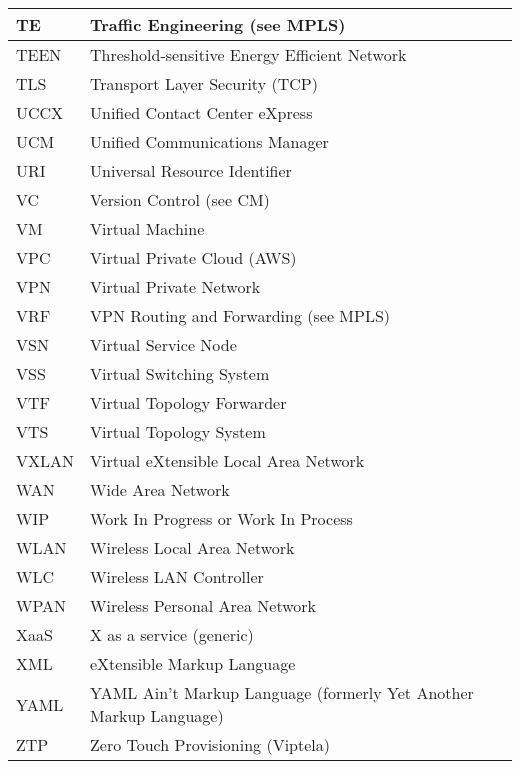 \begin{longtable}{ll}
  TE		&		Traffic Engineering (see MPLS)		\\ \midrule
  TEEN		&		Threshold-sensitive Energy Efficient Network		\\ \midrule
  TLS		&		Transport Layer Security (TCP)		\\ \midrule
  UCCX		&		Unified Contact Center eXpress		\\ \midrule
  UCM		&		Unified Communications Manager		\\ \midrule
  URI		&		Universal Resource Identifier		\\ \midrule
  VC		&		Version Control (see CM)		\\ \midrule
  VM		&		Virtual Machine		\\ \midrule
  VPC		&		Virtual Private Cloud (AWS)		\\ \midrule
  VPN		&		Virtual Private Network		\\ \midrule
  VRF		&		VPN Routing and Forwarding (see MPLS)		\\ \midrule
  VSN		&		Virtual Service Node		\\ \midrule
  VSS		&		Virtual Switching System		\\ \midrule
  VTF		&		Virtual Topology Forwarder		\\ \midrule
  VTS		&		Virtual Topology System		\\ \midrule
  VXLAN		&		Virtual eXtensible Local Area Network		\\ \midrule
  WAN		&		Wide Area Network		\\ \midrule
  WIP		&		Work In Progress or Work In Process		\\ \midrule
  WLAN		&		Wireless Local Area Network		\\ \midrule
  WLC		&		Wireless LAN Controller		\\ \midrule
  WPAN		&		Wireless Personal Area Network		\\ \midrule
  XaaS		&		X as a service (generic)		\\ \midrule
  XML		&		eXtensible Markup Language		\\ \midrule
  YAML		&		YAML Ain't Markup Language (formerly Yet Another Markup Language)		\\ \midrule
  ZTP		&		Zero Touch Provisioning (Viptela)		\\
  \bottomrule
\end{longtable}
